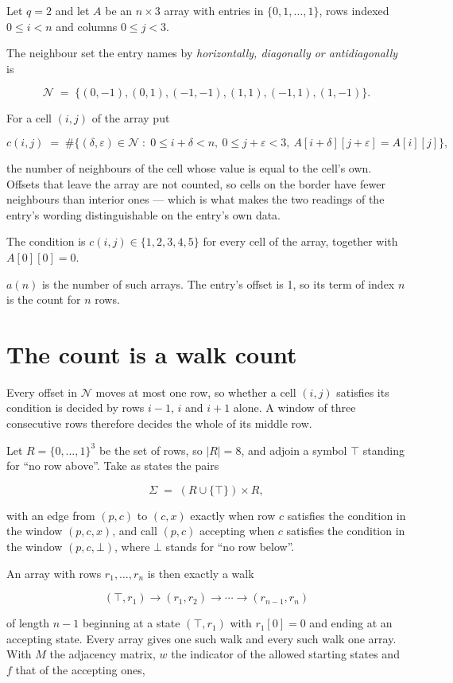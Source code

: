 \documentclass[11pt]{article}
\theoremstyle{definition}
\begin{document}
Let $q = 2$ and let $A$ be an $n \times 3$ array with entries in $\{0,1,\dots,1\}$, rows indexed $0 \le i < n$ and columns $0 \le j < 3$.

The neighbour set the entry names by {\itshape horizontally, diagonally or antidiagonally} is

\[\mathcal{N} \;=\; \{(0,-1), (0,1), (-1,-1), (1,1), (-1,1), (1,-1)\}.\]

For a cell $(i,j)$ of the array put

\[c(i,j) \;=\; \#\bigl\{(\delta,\varepsilon)\in\mathcal{N} \;:\; 0\le i+\delta<n,\ 0\le j+\varepsilon<3,\ A[i+\delta][j+\varepsilon] = A[i][j]\bigr\},\]

the number of neighbours of the cell whose value is equal to the cell's own. Offsets that leave the array are not counted, so cells on the border have fewer neighbours than interior ones --- which is what makes the two readings of the entry's wording distinguishable on the entry's own data.

The condition is $c(i,j) \in \{1, 2, 3, 4, 5\}$ for every cell of the array, together with $A[0][0]=0$.

$a(n)$ is the number of such arrays. The entry's offset is 1, so its term of index $n$ is the count for $n$ rows.

\section{The count is a walk count}

Every offset in $\mathcal{N}$ moves at most one row, so whether a cell $(i,j)$ satisfies its condition is decided by rows $i-1$, $i$ and $i+1$ alone. A window of three consecutive rows therefore decides the whole of its middle row.

Let $R = \{0,\dots,1\}^{3}$ be the set of rows, so $|R| = 8$, and adjoin a symbol $\top$ standing for ``no row above''. Take as states the pairs

\[\Sigma \;=\; (R \cup \{\top\}) \times R,\]

with an edge from $(p,c)$ to $(c,x)$ exactly when row $c$ satisfies the condition in the window $(p,c,x)$, and call $(p,c)$ accepting when $c$ satisfies the condition in the window $(p,c,\bot)$, where $\bot$ stands for ``no row below''.

An array with rows $r_1,\dots,r_n$ is then exactly a walk

\[(\top,r_1) \to (r_1,r_2) \to \cdots \to (r_{n-1},r_n)\]

of length $n-1$ beginning at a state $(\top,r_1)$ with $r_1[0]=0$ and ending at an accepting state. Every array gives one such walk and every such walk one array. With $M$ the adjacency matrix, $w$ the indicator of the allowed starting states and $f$ that of the accepting ones,
\end{document}
